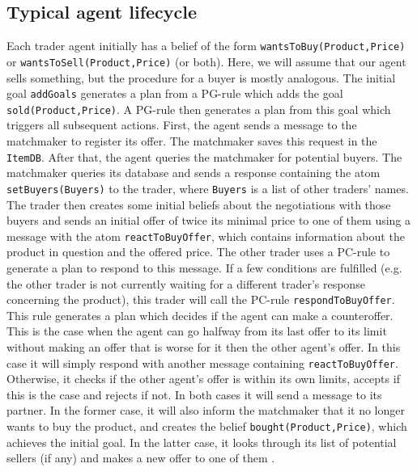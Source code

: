 \documentclass[a4paper,11pt]{article}
\begin{document}
\subsection{Typical agent lifecycle}
Each trader agent initially has a belief of the form \texttt{wantsToBuy(Product,Price)} or \texttt{wantsToSell(Product,Price)} (or both). Here, we will assume that our agent sells something, but the procedure for a buyer is mostly analogous. The initial goal \texttt{addGoals} generates a plan from a PG-rule which adds the goal \texttt{sold(Product,Price)}. A PG-rule then generates a plan from this goal which triggers all subsequent actions. First, the agent sends a message to the matchmaker to register its offer. The matchmaker saves this request in the \texttt{ItemDB}. After that, the agent queries the matchmaker for potential buyers. The matchmaker queries its database and sends a response containing the atom \texttt{setBuyers(Buyers)} to the trader, where \texttt{Buyers} is a list of other traders' names. The trader then creates some initial beliefs about the negotiations with those buyers and sends an initial offer of twice its minimal price to one of them using a message with the atom \texttt{reactToBuyOffer}, which contains information about the product in question and the offered price. The other trader uses a PC-rule to generate a plan to respond to this message. If a few conditions are fulfilled (e.g. the other trader is not currently waiting for a different trader's response concerning the product), this trader will call the PC-rule \texttt{respondToBuyOffer}. This rule generates a plan which decides if the agent can make a counteroffer. This is the case when the agent can go halfway from its last offer to its limit without making an offer that is worse for it then the other agent's offer. In this case it will simply respond with another message containing \texttt{reactToBuyOffer}. Otherwise, it checks if the other agent's offer is within its own limits, accepts if this is the case and rejects if not. In both cases it will send a message to its partner. In the former case, it will also inform the matchmaker that it no longer wants to buy the product, and creates the belief \texttt{bought(Product,Price)}, which achieves the initial goal. In the latter case, it looks through its list of potential sellers (if any) and makes a new offer to one of them .
\end{document}
